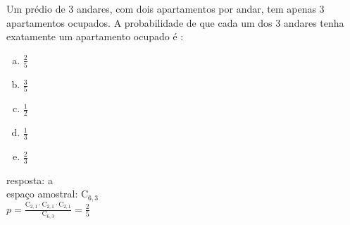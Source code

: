 \begin{ex}
 Um prédio de 3 andares, com dois apartamentos por andar, tem apenas 3 apartamentos ocupados. A probabilidade de que cada um dos 3 andares tenha exatamente um apartamento ocupado é :
    \begin{enumerate}[(a)]
    \item $\frac{2}{5}$
    \item $\frac{3}{5}$
    \item $\frac{1}{2}$
    \item $\frac{1}{3}$
    \item $\frac{2}{3}$
    \end{enumerate}
      \begin{sol}
        resposta: a \\
        espaço amostral: $\mathrm{C}_{6,3}$\\
        $p=\frac{\mathrm{C}_{2,1}\cdot\mathrm{C}_{2,1}\cdot\mathrm{C}_{2,1}}{\mathrm{C}_{6,3}}=\frac{2}{5}$
      \end{sol}
\end{ex}